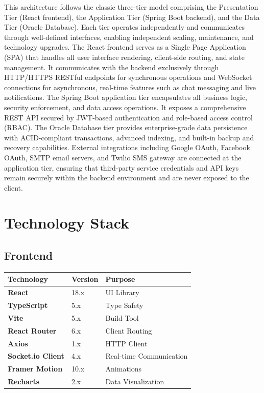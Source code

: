 \documentclass[
  12pt,
  a4paperpaper,
]{report}
\newcounter{none} %
\begin{document}
This architecture follows the classic three-tier model comprising the Presentation Tier (React frontend), the Application Tier (Spring Boot backend), and the Data Tier (Oracle Database). Each tier operates independently and communicates through well-defined interfaces, enabling independent scaling, maintenance, and technology upgrades. The React frontend serves as a Single Page Application (SPA) that handles all user interface rendering, client-side routing, and state management. It communicates with the backend exclusively through HTTP/HTTPS RESTful endpoints for synchronous operations and WebSocket connections for asynchronous, real-time features such as chat messaging and live notifications. The Spring Boot application tier encapsulates all business logic, security enforcement, and data access operations. It exposes a comprehensive REST API secured by JWT-based authentication and role-based access control (RBAC). The Oracle Database tier provides enterprise-grade data persistence with ACID-compliant transactions, advanced indexing, and built-in backup and recovery capabilities. External integrations including Google OAuth, Facebook OAuth, SMTP email servers, and Twilio SMS gateway are connected at the application tier, ensuring that third-party service credentials and API keys remain securely within the backend environment and are never exposed to the client.

\section{Technology Stack}\label{technology-stack}

\subsection{Frontend}

{\def\LTcaptype{none}
\begin{longtable}[]{@{}lll@{}}
\hline
Technology & Version & Purpose \\
\hline
\endhead
\hline
\endlastfoot
\textbf{React} & 18.x & UI Library \\
\textbf{TypeScript} & 5.x & Type Safety \\
\textbf{Vite} & 5.x & Build Tool \\
\textbf{React Router} & 6.x & Client Routing \\
\textbf{Axios} & 1.x & HTTP Client \\
\textbf{Socket.io Client} & 4.x & Real-time Communication \\
\textbf{Framer Motion} & 10.x & Animations \\
\textbf{Recharts} & 2.x & Data Visualization \\
\end{longtable}
}
\end{document}
